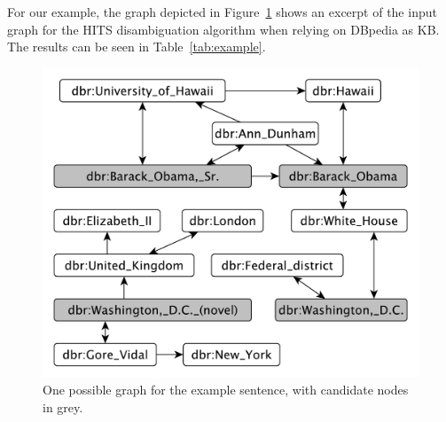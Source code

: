 For our example, the graph depicted in Figure~\ref{fig:example} shows an excerpt of the input graph for the  \ac{HITS} disambiguation algorithm when relying on DBpedia as \ac{KB}. 
The results can be seen in Table~\ref{tab:example}. 

\begin{figure}[htb!]
	\begin{minipage}[b]{0.57\textwidth} 
         \centering
        \includegraphics[width=\linewidth]{part_02/unstructured_annotation/fig/exampleGraph.pdf}
        \caption{One possible graph for the example sentence, with candidate nodes in grey.}
        \label{fig:example}
    \end{minipage}
	\hfill
	\begin{minipage}[b]{0.42\textwidth}
        \centering
        

\end{minipage}
\end{figure}
